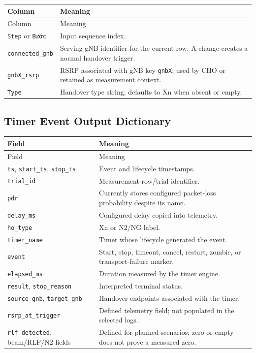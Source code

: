 \begin{longtable}{p{4.3cm}p{9.6cm}}
\toprule
Column & Meaning\\
\midrule
\endfirsthead
\toprule
Column & Meaning\\
\midrule
\endhead
\texttt{Step} or \texttt{Bước} & Input sequence index.\\
\texttt{connected\_gnb} & Serving gNB identifier for the current row. A change creates a normal handover trigger.\\
\texttt{gnbX\_rsrp} & RSRP associated with gNB key \texttt{gnbX}; used by CHO or retained as measurement context.\\
\texttt{Type} & Handover type string; defaults to Xn when absent or empty.\\
\bottomrule
\end{longtable}

\subsection{Timer Event Output Dictionary}

\begin{longtable}{p{4.1cm}p{9.8cm}}
\toprule
Field & Meaning\\
\midrule
\endfirsthead
\toprule
Field & Meaning\\
\midrule
\endhead
\texttt{ts}, \texttt{start\_ts}, \texttt{stop\_ts} & Event and lifecycle timestamps.\\
\texttt{trial\_id} & Measurement-row/trial identifier.\\
\texttt{pdr} & Currently stores configured packet-loss probability despite its name.\\
\texttt{delay\_ms} & Configured delay copied into telemetry.\\
\texttt{ho\_type} & Xn or N2/NG label.\\
\texttt{timer\_name} & Timer whose lifecycle generated the event.\\
\texttt{event} & Start, stop, timeout, cancel, restart, zombie, or transport-failure marker.\\
\texttt{elapsed\_ms} & Duration measured by the timer engine.\\
\texttt{result}, \texttt{stop\_reason} & Interpreted terminal status.\\
\texttt{source\_gnb}, \texttt{target\_gnb} & Handover endpoints associated with the timer.\\
\texttt{rsrp\_at\_trigger} & Defined telemetry field; not populated in the selected logs.\\
\texttt{rlf\_detected}, beam/RLF/N2 fields & Defined for planned scenarios; zero or empty does not prove a measured zero.\\
\bottomrule
\end{longtable}

